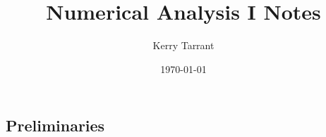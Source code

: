 \documentclass{book}
\title{Numerical Analysis I Notes}
\author{Kerry Tarrant}
\date\today
\begin{document}
\maketitle
\tableofcontents{}


\chapter{}

\section{Preliminaries}
\end{document}
